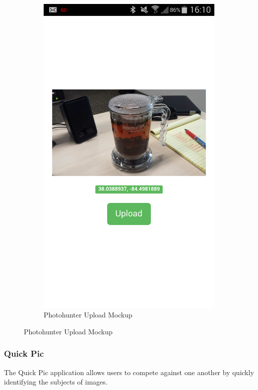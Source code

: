 \documentclass{article}
\begin{document}
\begin{figure}
\begin{subfigure}[b]{0.49\textwidth}
    \includegraphics[width=\textwidth]{photohunter/submit}
    \caption{Photohunter Upload Mockup}
  \end{subfigure}
\end{figure}

\subsubsection{Quick Pic}
The Quick Pic application allows users to compete against one another by
quickly identifying the subjects of images.
\end{document}
